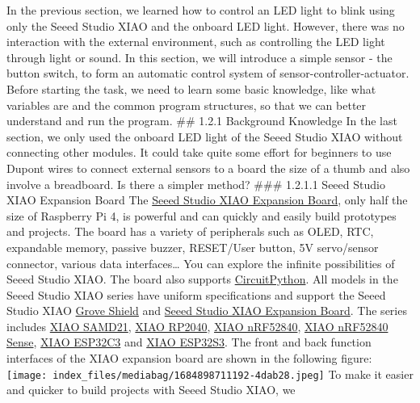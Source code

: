 \documentclass[
  letterpaper,
  DIV=11,
  numbers=noendperiod]{scrreprt}
\begin{document}
In the previous section, we learned how to control an LED light to blink
using only the Seeed Studio XIAO and the onboard LED light. However,
there was no interaction with the external environment, such as
controlling the LED light through light or sound. In this section, we
will introduce a simple sensor - the button switch, to form an automatic
control system of sensor-controller-actuator. Before starting the task,
we need to learn some basic knowledge, like what variables are and the
common program structures, so that we can better understand and run the
program. \#\# 1.2.1 Background Knowledge In the last section, we only
used the onboard LED light of the Seeed Studio XIAO without connecting
other modules. It could take quite some effort for beginners to use
Dupont wires to connect external sensors to a board the size of a thumb
and also involve a breadboard. Is there a simpler method? \#\#\# 1.2.1.1
Seeed Studio XIAO Expansion Board The
\href{https://www.seeedstudio.com/Seeeduino-XIAO-Expansion-board-p-4746.html}{Seeed
Studio XIAO Expansion Board}, only half the size of Raspberry Pi 4, is
powerful and can quickly and easily build prototypes and projects. The
board has a variety of peripherals such as OLED, RTC, expandable memory,
passive buzzer, RESET/User button, 5V servo/sensor connector, various
data interfaces\ldots{} You can explore the infinite possibilities of
Seeed Studio XIAO. The board also supports
\href{https://circuitpython.org/}{CircuitPython}. All models in the
Seeed Studio XIAO series have uniform specifications and support the
Seeed Studio XIAO
\href{https://seeedstudio.com/Grove-Shield-for-Seeeduino-XIAO-p-4621.html}{Grove
Shield} and
\href{https://www.seeedstudio.com/Seeeduino-XIAO-Expansion-board-p-4746.html}{Seeed
Studio XIAO Expansion Board}. The series includes
\href{https://www.seeedstudio.com/Seeeduino-XIAO-Arduino-Microcontroller-SAMD21-Cortex-M0+-p-4426.html}{XIAO
SAMD21},
\href{https://www.seeedstudio.com/XIAO-RP2040-v1-0-p-5026.html}{XIAO
RP2040},
\href{https://www.seeedstudio.com/Seeed-XIAO-BLE-nRF52840-p-5201.html}{XIAO
nRF52840},
\href{https://www.seeedstudio.com/Seeed-XIAO-BLE-Sense-nRF52840-p-5253.html}{XIAO
nRF52840 Sense},
\href{https://www.seeedstudio.com/Seeed-XIAO-ESP32C3-p-5431.html}{XIAO
ESP32C3} and
\href{https://www.seeedstudio.com/XIAO-ESP32S3-Sense-p-5639.html}{XIAO
ESP32S3}. The front and back function interfaces of the XIAO expansion
board are shown in the following figure:
\texttt{[image: index\_files/mediabag/1684898711192-4dab28.jpeg]} To make
it easier and quicker to build projects with Seeed Studio XIAO, we
\end{document}
